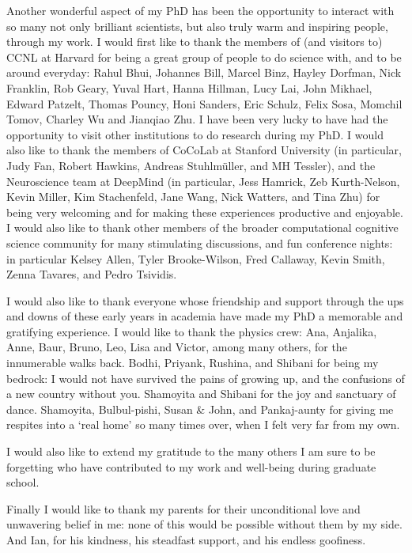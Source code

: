 Another wonderful aspect of my PhD has been the opportunity to interact with so many not only brilliant scientists, but also truly warm and inspiring people, through my work. I would first like to thank the members of (and visitors to) CCNL at Harvard for being a great group of people to do science with, and to be around everyday: Rahul Bhui, Johannes Bill, Marcel Binz, Hayley Dorfman, Nick Franklin, Rob Geary, Yuval Hart, Hanna Hillman, Lucy Lai, John Mikhael, Edward Patzelt, Thomas Pouncy, Honi Sanders, Eric Schulz, Felix Sosa,  Momchil Tomov, Charley Wu and Jianqiao Zhu. I have been very lucky to have had the opportunity to visit other institutions to do research during my PhD. I would also like to thank the members of CoCoLab at Stanford University (in particular, Judy Fan, Robert Hawkins, Andreas Stuhlmüller, and MH Tessler), and the Neuroscience team at DeepMind (in particular, Jess Hamrick, Zeb Kurth-Nelson, Kevin Miller, Kim Stachenfeld, Jane Wang, Nick Watters, and Tina Zhu) for being very welcoming and for making these experiences productive and enjoyable. I would also like to thank other members of the broader computational cognitive science community for many stimulating discussions, and fun conference nights: in particular Kelsey Allen, Tyler Brooke-Wilson, Fred Callaway, Kevin Smith, Zenna Tavares, and Pedro Tsividis.

I would also like to thank everyone whose friendship and support through the ups and downs of these early years in academia have made my PhD a memorable and gratifying experience. I would like to thank the physics crew: Ana, Anjalika, Anne, Baur, Bruno, Leo, Lisa and Victor, among many others, for the innumerable walks back. Bodhi, Priyank, Rushina, and Shibani for being my bedrock: I would not have survived the pains of growing up, and the confusions of a new country without you. Shamoyita and Shibani for the joy and sanctuary of dance. Shamoyita, Bulbul-pishi, Susan \& John, and Pankaj-aunty for giving me respites into a `real home' so many times over, when I felt very far from my own.

I would also like to extend my gratitude to the many others I am sure to be forgetting who have contributed to my work and well-being during graduate school.


Finally I would like to thank my parents for their unconditional love and unwavering belief in me: none of this would be possible without them by my side. And Ian, for his kindness, his steadfast support, and his endless goofiness.

%
%
%
%
%
%
%
%



